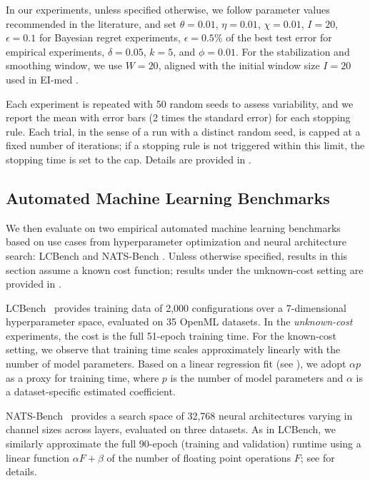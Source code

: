 In our experiments, unless specified otherwise, we follow parameter values recommended in the literature, and set $\theta = 0.01$, $\eta=0.01$, $\chi = 0.01$, $I = 20$, $\epsilon = 0.1$ for Bayesian regret experiments, $\epsilon = 0.5\%$ of the best test error for empirical experiments, $\delta=0.05$, $k=5$, and $\phi = 0.01$.
For the stabilization and smoothing window, we use $W=20$, aligned with the initial window size $I=20$ used in EI-med \citep{ishibashi2023stopping}.

Each experiment is repeated with 50 random seeds to assess variability, and we report the mean with error bars (2 times the standard error) for each stopping rule. 
Each trial, in the sense of a run with a distinct random seed, is capped at a fixed number of iterations; if a stopping rule is not triggered within this limit, the stopping time is set to the cap. Details are provided in .


\subsection{Automated Machine Learning Benchmarks}

We then evaluate on two empirical automated machine learning benchmarks based on use cases from hyperparameter optimization and neural architecture search: LCBench \citep{ZimLin2021a} and NATS-Bench \citep{dong2021nats}.
Unless otherwise specified, results in this section assume a known cost function; results under the unknown-cost setting are provided in .

LCBench~\cite{ZimLin2021a} provides training data of 2,000 configurations over a 7-dimensional hyperparameter space, evaluated on 35 OpenML \cite{vanschoren2014openml} datasets. 
In the \emph{unknown-cost} experiments, the cost is the full 51-epoch training time. 
For the known-cost setting, we observe that training time scales approximately linearly with the number of model parameters. 
Based on a linear regression fit (see ), we adopt $\alpha p$ as a proxy for training time, where $p$ is the number of model parameters and $\alpha$ is a dataset-specific estimated coefficient.

NATS-Bench~\cite{dong2021nats} provides a search space of 32,768 neural architectures varying in channel sizes across layers, evaluated on three datasets. As in LCBench, we similarly approximate the full 90-epoch (training and validation) runtime using a linear function $\alpha F + \beta$ of the number of floating point operations $F$; see  for details.

